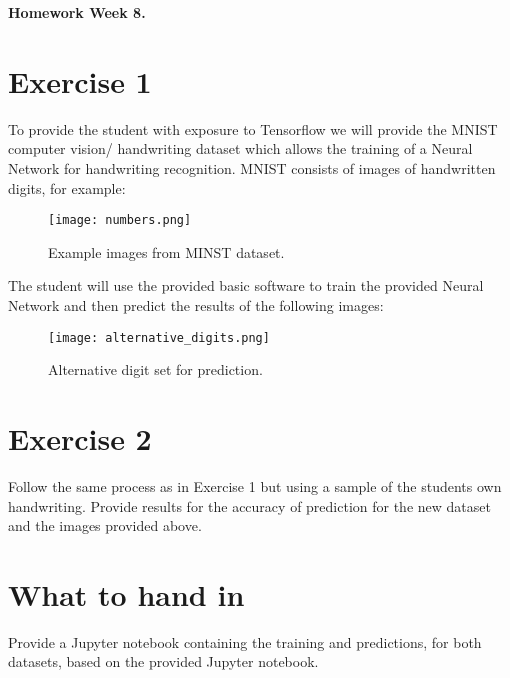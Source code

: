 \documentclass[11pt]{article}
\begin{document}
\begin{center}
{\bf{ \large Homework Week 8.}}\\
\makeatletter\@date\makeatother
\end{center}

\section{Exercise 1}
To provide the student with exposure to Tensorflow we will provide the MNIST computer vision/ handwriting dataset which allows the training of a Neural Network for handwriting recognition. MNIST consists of images of handwritten digits, for example:
\begin{figure}[H]
\center
\texttt{[image: numbers.png]}
\caption{Example images from MINST dataset.}
\label{minst}
\end{figure}

The student will use the provided basic software to train the provided Neural Network and then predict the results of the following images:
\begin{figure}[H]
\center
\texttt{[image: alternative\_digits.png]}
\caption{Alternative digit set for prediction.}
\label{alt}
\end{figure}

\section{Exercise 2}
Follow the same process as in Exercise 1 but using a sample of the students own handwriting. Provide results for the accuracy of prediction for the new dataset and the images provided above.

\section{What to hand in}
Provide a Jupyter notebook containing the training and predictions, for both datasets, based on the provided Jupyter notebook.
\end{document}

